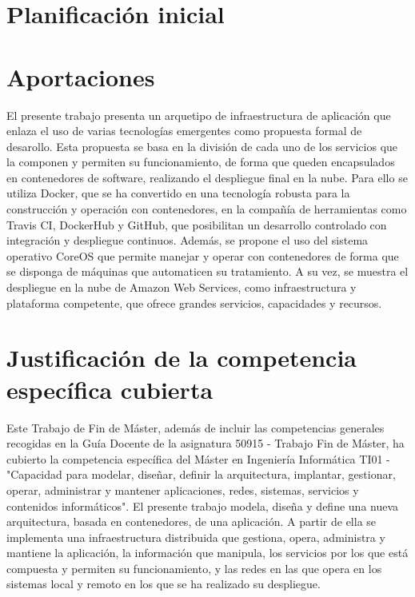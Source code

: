 \section{Planificación inicial}

\section{Aportaciones}

El presente trabajo presenta un arquetipo de infraestructura de aplicación que enlaza el uso de varias tecnologías emergentes como propuesta formal de desarollo. Esta propuesta se basa en la división de cada uno de los servicios que la componen y permiten su funcionamiento, de forma que queden encapsulados en contenedores de software, realizando el despliegue final en la nube. Para ello se utiliza Docker, que se ha convertido en una tecnología robusta para la construcción y operación con contenedores, en la compañía de herramientas como Travis CI, DockerHub y GitHub, que posibilitan un desarrollo controlado con integración y despliegue continuos. Además, se propone el uso del sistema operativo CoreOS que permite manejar y operar con contenedores de forma que se disponga de máquinas que automaticen su tratamiento. A su vez, se muestra el despliegue en la nube de Amazon Web Services, como infraestructura y plataforma competente, que ofrece grandes servicios, capacidades y recursos.

\section{Justificación de la competencia específica cubierta}

Este Trabajo de Fin de Máster, además de incluir las competencias generales recogidas en la Guía Docente de la asignatura 50915 - Trabajo Fin de Máster, ha cubierto la competencia específica del Máster en Ingeniería Informática TI01 - "Capacidad para modelar, diseñar, definir la arquitectura, implantar, gestionar, operar, administrar y mantener aplicaciones, redes, sistemas, servicios y contenidos informáticos". El presente trabajo modela, diseña y define una nueva arquitectura, basada en contenedores, de una aplicación. A partir de ella se implementa una infraestructura distribuida que gestiona, opera, administra y mantiene la aplicación, la información que manipula, los servicios por los que está compuesta y permiten su funcionamiento, y las redes en las que opera en los sistemas local y remoto en los que se ha realizado su despliegue.


